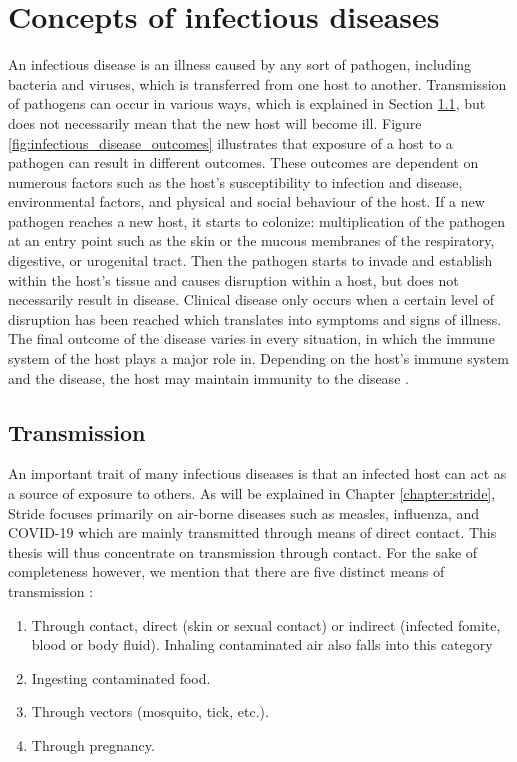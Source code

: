 \section{Concepts of infectious diseases}
\label{sec:concepts_of_infectious_diseases}
An infectious disease is an illness caused by any sort of pathogen, including bacteria and viruses, which is transferred from one host to another. Transmission of pathogens can occur in various ways, which is explained in Section \ref{subsec:transmission}, but does not necessarily mean that the new host will become ill. Figure \ref{fig:infectious_disease_outcomes} illustrates that exposure of a host to a pathogen can result in different outcomes. These outcomes are dependent on numerous factors such as the host's susceptibility to infection and disease, environmental factors, and physical and social behaviour of the host. If a new pathogen reaches a new host, it starts to colonize: multiplication of the pathogen at an entry point such as the skin or the mucous membranes of the respiratory, digestive, or urogenital tract. Then the pathogen starts to invade and establish within the host's tissue and causes disruption within a host, but does not necessarily result in disease. Clinical disease only occurs when a certain level of disruption has been reached which translates into symptoms and signs of illness. The final outcome of the disease varies in every situation, in which the immune system of the host plays a major role in. Depending on the host's immune system and the disease, the host may maintain immunity to the disease \cite{book:principles_infectious_diseases}.

\subsection{Transmission}
\label{subsec:transmission}
An important trait of many infectious diseases is that an infected host can act as a source of exposure to others. As will be explained in Chapter \ref{chapter:stride}, Stride focuses primarily on air-borne diseases such as measles, influenza, and COVID-19 which are mainly transmitted through means of direct contact. This thesis will thus concentrate on transmission through contact. For the sake of completeness however, we mention that there are five distinct means of transmission \cite{book:transmission_principles}:

\begin{enumerate}
    \item Through contact, direct (skin or sexual contact) or indirect (infected fomite, blood or body fluid). Inhaling contaminated air also falls into this category
    \item Ingesting contaminated food.
    \item Through vectors (mosquito, tick, etc.).
    \item Through pregnancy.
\end{enumerate}

